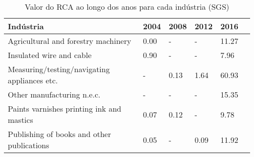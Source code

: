 \begin{table}
\centering
\caption{Valor do RCA ao longo dos anos para cada indústria (SGS)}
\label{tab:ex3-tempo-SGS}
\begin{tabular}{p{6cm}p{1.5cm}p{1.5cm}p{1.5cm}p{1.5cm}p{1.5cm}}
\toprule
                                   Indústria & 2004 & 2008 & 2012 &  2016 \\
\midrule
         Agricultural and forestry machinery & 0.00 &    - &    - & 11.27 \\
                    Insulated wire and cable & 0.90 &    - &    - &  7.96 \\
Measuring/testing/navigating appliances etc. &    - & 0.13 & 1.64 & 60.93 \\
                  Other manufacturing n.e.c. &    - &    - &    - & 15.35 \\
   Paints varnishes printing ink and mastics & 0.07 & 0.12 &    - &  9.78 \\
  Publishing of books and other publications & 0.05 &    - & 0.09 & 11.92 \\
\bottomrule
\end{tabular}
\end{table}
